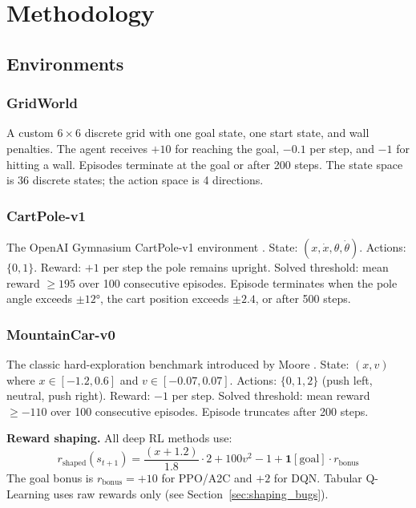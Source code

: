 \documentclass[a4paper,12pt]{article}
\begin{document}
\section{Methodology}
\label{sec:methodology}

\subsection{Environments}

\subsubsection{GridWorld}

A custom $6\times6$ discrete grid with one goal state, one start state, and wall penalties. The agent receives $+10$ for reaching the goal, $-0.1$ per step, and $-1$ for hitting a wall. Episodes terminate at the goal or after 200 steps. The state space is 36 discrete states; the action space is 4 directions.

\subsubsection{CartPole-v1}

The OpenAI Gymnasium CartPole-v1 environment \cite{brockman2016openai}. State: $(x, \dot{x}, \theta, \dot{\theta})$. Actions: $\{0,1\}$. Reward: $+1$ per step the pole remains upright. Solved threshold: mean reward $\geq 195$ over 100 consecutive episodes. Episode terminates when the pole angle exceeds $\pm12°$, the cart position exceeds $\pm2.4$, or after 500 steps.

\subsubsection{MountainCar-v0}

The classic hard-exploration benchmark introduced by Moore \cite{moore1990efficient}. State: $(x, v)$ where $x \in [-1.2, 0.6]$ and $v \in [-0.07, 0.07]$. Actions: $\{0,1,2\}$ (push left, neutral, push right). Reward: $-1$ per step. Solved threshold: mean reward $\geq -110$ over 100 consecutive episodes. Episode truncates after 200 steps.

\textbf{Reward shaping.} All deep RL methods use:
\begin{equation}
  r_{\text{shaped}}(s_{t+1}) = \frac{(x+1.2)}{1.8} \cdot 2 + 100v^2 - 1 + \mathbf{1}[\text{goal}] \cdot r_{\text{bonus}}
\end{equation}
The goal bonus is $r_{\text{bonus}} = +10$ for PPO/A2C and $+2$ for DQN. Tabular Q-Learning uses raw rewards only (see Section~\ref{sec:shaping_bugs}).
\end{document}
